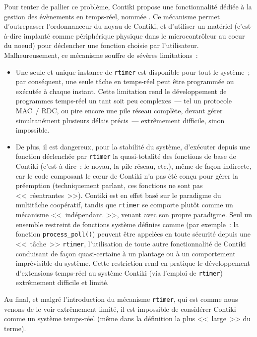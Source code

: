 Pour tenter de pallier ce problème, Contiki propose une fonctionnalité
dédiée à la gestion des évènements en temps-réel, nommée
. Ce mécanisme permet d'outrepasser l'ordonnanceur
du noyau de Contiki, et d'utiliser un  matériel (c'est-à-dire
implanté comme périphérique physique dans le microcontrôleur au coeur
du noeud) pour déclencher une fonction choisie par l'utilisateur.
Malheureusement, ce mécanisme souffre de sévères limitations~:

\begin{itemize}

\item Une seule et unique instance de \texttt{rtimer} est disponible pour
tout le système~; par conséquent, une seule tâche en temps-réel peut être
programmée ou exécutée à chaque instant. Cette limitation rend le
développement de programmes temps-réel un tant soit peu complexes~---
tel un protocole MAC~/ RDC, ou pire encore une pile réseau complète, devant
gérer simultanément plusieurs délais précis~--- extrêmement difficile,
sinon impossible.

\item De plus, il est dangereux, pour la stabilité du système, d'exécuter
depuis une fonction déclenchée par \texttt{rtimer} la quasi-totalité
des fonctions de base de Contiki (c'est-à-dire~: le noyau, la pile réseau,
etc.), même de façon indirecte, car le code composant le c{\oe}ur de Contiki
n'a pas été conçu pour gérer la préemption (techniquement parlant, ces
fonctions ne sont pas <<~réentrantes~>>). Contiki est en effet basé sur
le paradigme du multitâche coopératif, tandis que \texttt{rtimer} se
comporte plutôt comme un mécanisme <<~indépendant~>>, venant avec son
propre paradigme. Seul un ensemble restreint de fonctions système définies
comme  (par exemple~: la fonction
\texttt{process\_poll()}) peuvent être appelées en toute sécurité depuis
une <<~tâche~>> \texttt{rtimer}, l'utilisation de toute autre fonctionnalité
de Contiki conduisant de façon quasi-certaine à un plantage ou à un
comportement imprévisible du système. Cette restriction rend en pratique
le développement d'extensions temps-réel au système Contiki (via l'emploi
de \texttt{rtimer}) extrêmement difficile et limité.

\end{itemize}

Au final, et malgré l'introduction du mécanisme \texttt{rtimer}, qui est
comme nous venons de le voir extrêmement limité, il est impossible de
considérer Contiki comme un système temps-réel (même dans la définition
la plus <<~large~>> du terme).

